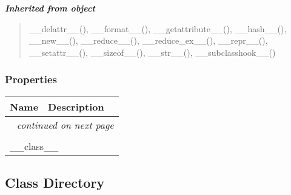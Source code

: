 \large{\textbf{\textit{Inherited from object}}}

\begin{quote}
\_\_delattr\_\_(), \_\_format\_\_(), \_\_getattribute\_\_(), \_\_hash\_\_(), \_\_new\_\_(), \_\_reduce\_\_(), \_\_reduce\_ex\_\_(), \_\_repr\_\_(), \_\_setattr\_\_(), \_\_sizeof\_\_(), \_\_str\_\_(), \_\_subclasshook\_\_()
\end{quote}


  \subsubsection{Properties}

    \vspace{-1cm}
\hspace{\varindent}\begin{longtable}{|p{\varnamewidth}|p{\vardescrwidth}|l}
\cline{1-2}
\cline{1-2} \centering \textbf{Name} & \centering \textbf{Description}& \\
\cline{1-2}
\endhead\cline{1-2}\multicolumn{3}{r}{\small\textit{continued on next page}}\\\endfoot\cline{1-2}
\endlastfoot\multicolumn{2}{|l|}{\textit{Inherited from object}}\\
\multicolumn{2}{|p{\varwidth}|}{\raggedright \_\_class\_\_}\\
\cline{1-2}
\end{longtable}



\subsection{Class Directory}

